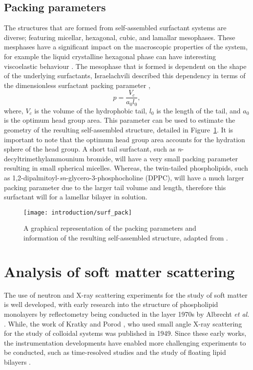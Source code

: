 \subsection{Packing parameters}

The structures that are formed from self-assembled surfactant systems are diverse; featuring micellar, hexagonal, cubic, and lamallar mesophases.
These mesphases have a significant impact on the macroscopic properties of the system, for example the liquid crystalline hexagonal phase can have interesting viscoelastic behaviour \cite{jurasin_lamellar_2013,cordobes_linear_1997}.
The mesophase that is formed is dependent on the shape of the underlying surfactants, Israelachvili described this dependency in terms of the dimensionless surfactant packing parameter \cite{israelachvili_intermolecular_2011},
%
\begin{equation}
p = \frac{V_c}{a_0l_0},
\end{equation}
%
where, $V_c$ is the volume of the hydrophobic tail, $l_0$ is the length of the tail, and $a_0$ is the optimum head group area.
This parameter can be used to estimate the geometry of the resulting self-assembled structure, detailed in Figure~\ref{fig:pack}.
It is important to note that the optimum head group area accounts for the hydration sphere of the head group.
A short tail surfactant, such as \emph{n}-decyltrimethylammounium bromide, will have a very small packing parameter resulting in small spherical micelles.
Whereas, the twin-tailed phospholipids, such as 1,2-dipalmitoyl-\emph{sn}-glycero-3-phosphocholine (DPPC), will have a much larger packing parameter due to the larger tail volume and length, therefore this surfactant will for a lamellar bilayer in solution.
%
\begin{figure}
    \centering
    \texttt{[image: introduction/surf\_pack]}
    \caption{A graphical representation of the packing parameters and information of the resulting self-assembled structure, adapted from \cite{israelachvili_intermolecular_2011}.}
    \label{fig:pack}
\end{figure}
%

\section{Analysis of soft matter scattering}

The use of neutron and X-ray scattering experiments for the study of soft matter is well developed, with early research into the structure of phospholipid monolayers by reflectometry being conducted in the layer 1970s by Albrecht \emph{et al.} \cite{albrecht_polymorphism_1978}.
While, the work of Kratky and Porod \cite{kratky_diffuse_1949}, who used small angle X-ray scattering for the study of colloidal systems was published in 1949.
Since these early works, the instrumentation developments have enabled more challenging experiments to be conducted, such as time-resolved studies \cite{jensen_monitoring_2014} and the study of floating lipid bilayers \cite{rondelli_reflectivity_2012}.

